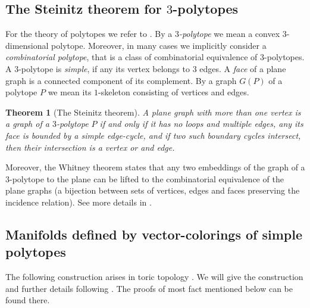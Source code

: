 \documentclass[12pt]{amsart}
\newtheorem{theorem}[formula]{Theorem}
\theoremstyle{definition}
\theoremstyle{remark}
\begin{document}
\subsection{The Steinitz theorem for $3$-polytopes}
For the theory of polytopes we refer to \cite{Z07,Gb03}.
By a {\it $3$-polytope} we mean a convex $3$-dimensional polytope. Moreover, in many cases 
we implicitly consider a {\it combinatorial polytope}, that is a class of combinatorial equivalence of $3$-polytopes.
 A $3$-polytope is {\it simple}, if any its vertex belongs to $3$ edges. A {\it face} of a plane graph is a connected component
 of its complement. By a graph $G(P)$ of a polytope $P$ we mean its $1$-skeleton consisting of vertices and edges. 
 \begin{theorem}[The Steinitz theorem]\label{StT}
A plane graph with more than one vertex is a graph of a $3$-polytope $P$ if and only if 
it has no loops and multiple edges, any its face is bounded by a simple edge-cycle, 
and if two such boundary cycles  intersect, then their intersection is a  vertex or and edge.
\end{theorem} 
Moreover, the Whitney theorem states that any two embeddings of the graph of a $3$-polytope to the plane
can be lifted to the combinatorial equivalence of the plane graphs (a bijection between sets of vertices, edges and faces
preserving the incidence relation).  See more details in \cite[Corollary 2.5.1]{BE17I}.

\subsection{Manifolds defined by vector-colorings of simple polytopes}
The following construction arises in toric topology \cite{BP15, DJ91}. We will give the construction and further
details following \cite{E24,E26}. The proofs of most fact mentioned below can be found there.
\end{document}
